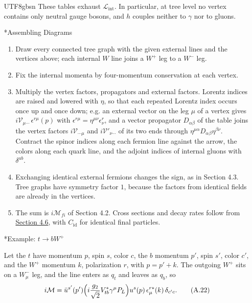 \documentclass[11pt,a4paper,oneside]{report}
\makeatletter
\newcommand\topic{\@startsection{paragraph}{4}{\z@}{-1.7ex plus -.3ex}{.5ex}{\normalfont\normalsize\bfseries\itshape\boldmath}*}
\makeatother
\begin{document}
\begin{CJK*}{UTF8}{gbsn}
These tables exhaust $\mathcal L_{\mathrm{int}}$. In particular, at tree level no vertex contains only neutral gauge bosons, and $h$ couples neither to $\gamma$ nor to gluons.

\topic{Assembling Diagrams}
\begin{enumerate}


\item Draw every connected tree graph with the given external lines and the vertices above; each internal $W$ line joins a $W^+$ leg to a $W^-$ leg.

\item Fix the internal momenta by four-momentum conservation at each vertex.

\item Multiply the vertex factors, propagators and external factors. Lorentz indices are raised and lowered with $\eta$, so that each repeated Lorentz index occurs once up and once down; e.g. an external vector on the leg $\mu$ of a vertex gives $i\mathcal V_{\mu\cdots}\,\epsilon^{r\mu}(p)$ with $\epsilon^{r\mu}=\eta^{\mu\nu}\epsilon^r_\nu$, and a vector propagator $D_{\alpha\beta}$ of the table joins the vertex factors $i\mathcal V_{\cdots\mu}$ and $i\mathcal V'_{\nu\cdots}$ of its two ends through $\eta^{\mu\alpha}D_{\alpha\beta}\eta^{\beta\nu}$. Contract the spinor indices along each fermion line against the arrow, the colors along each quark line, and the adjoint indices of internal gluons with $\delta^{ab}$.

\item Exchanging identical external fermions changes the sign, as in Section 4.3. Tree graphs have symmetry factor $1$, because the factors from identical fields are already in the vertices.

\item The sum is $i\mathcal M_{fi}$ of Section 4.2. Cross sections and decay rates follow from \hyperref[cross-sections-and-decay-rates]{Section 4.6}, with $C_{\mathrm{id}}$ for identical final particles.
\end{enumerate}


\topic{Example: $t\to bW^+$}

Let the $t$ have momentum $p$, spin $s$, color $c$, the $b$ momentum $p'$, spin $s'$, color $c'$, and the $W^+$ momentum $k$, polarization $r$, with $p=p'+k$. The outgoing $W^+$ sits on a $W^-_\mu$ leg, and the line enters as $q_t$ and leaves as $q_b$, so
\begin{equation*}
i\mathcal M=\bar u^{s'}(p')\Bigl(i\frac{g_2}{\sqrt2}V^*_{tb}\gamma^\mu P_L\Bigr)u^s(p)\,\epsilon^{r*}_\mu(k)\,\delta_{c'c} .
\tag{A.22}\label{eq:A.22}
\end{equation*}


\end{CJK*}
\end{document}
